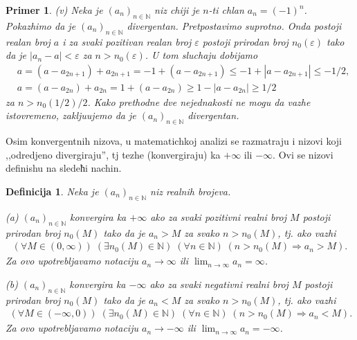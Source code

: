 \documentclass[11pt,a4paper]{article}
\newtheorem{defi}{Definicija}[section]
\newtheorem{pri}{Primer}[section]
\newcommand{\cyr}{\fontencoding{OT2}\selectfont\selectlanguage{serbian}}
\begin{document}
\begin{pri}
(v)  Neka je $(a_n)_{n\in\mathbb{N}}$ niz chiji 
je $n$-ti chlan $a_n=(-1)^n$. Pokazhimo da je $(a_n)_{n\in\mathbb{N}}$
divergentan. 
Pretpostavimo suprotno. 
Onda postoji realan broj $a$ i za svaki pozitivan realan broj $\varepsilon$
postoji prirodan broj $n_{0}(\varepsilon)$ tako da je 
$|a_n-a|<\varepsilon$ za $n>n_{0}(\varepsilon)$. 
U tom sluchaju dobijamo 
\begin{align*}
    &
    a=(a-a_{2n+1} ) + a_{2n+1}
    =-1+(a-a_{2n+1} )
    \leq 
    -1+|a-a_{2n+1} |
    \leq 
    -1/2, 
    \\
    &
    a=(a-a_{2n} ) + a_{2n}
    =1+(a-a_{2n} )
    \geq 
    1-|a-a_{2n} |
    \geq 
    1/2
\end{align*}
za $n>n_0(1/2)/2$. 
Kako prethodne dve nejednakosti ne mogu da vazhe istovremeno, 
zaklju\cyr{ch}ujemo da je $(a_n)_{n\in\mathbb{N}}$ divergentan. 
\end{pri}

Osim konvergentnih nizova, 
u matematichkoj analizi se razmatraju i nizovi 
koji ,,odredjeno divergiraju'', tj tezhe (konvergiraju) ka 
$+\infty$ ili $-\infty$. 
Ovi se nizovi definishu na sledeћi nachin. 

\begin{defi}
Neka je $(a_n)_{n\in\mathbb{N}}$ niz realnih brojeva. 

(a) $(a_n)_{n\in\mathbb{N}}$ konvergira ka $+\infty$
ako za svaki pozitivni realni broj $M$ postoji prirodan broj
$n_{0}(M)$ tako da je 
$a_{n}>M$ za svako $n>n_{0}(M)$, 
tj. ako vazhi 
\begin{align*}
     (\forall M\in(0,\infty) )
     \; (\exists n_0(M)\in\mathbb{N} )
     \; (\forall n\in\mathbb{N})
     \; (n>n_0(M)\Rightarrow
     a_n>M).  
 \end{align*}
 Za ovo upotrebljavamo notaciju 
 $a_n\rightarrow \infty$ ili
 $\displaystyle\lim_{n\rightarrow\infty}a_n=\infty$. 
 
(b) $(a_n)_{n\in\mathbb{N}}$ konvergira ka $-\infty$
ako za svaki negativni realni broj $M$ postoji prirodan broj
$n_{0}(M)$ tako da je 
$a_{n}<M$ za svako $n>n_{0}(M)$, 
tj. ako vazhi 
\begin{align*}
     (\forall M\in(-\infty,0) )
     \; (\exists n_0(M)\in\mathbb{N} )
     \; (\forall n\in\mathbb{N})
     \; (n>n_0(M)\Rightarrow
     a_n<M).  
 \end{align*}
 Za ovo upotrebljavamo notaciju 
 $a_n\rightarrow -\infty$ ili
 $\displaystyle\lim_{n\rightarrow\infty}a_n=-\infty$.
\end{defi}
\end{document}
